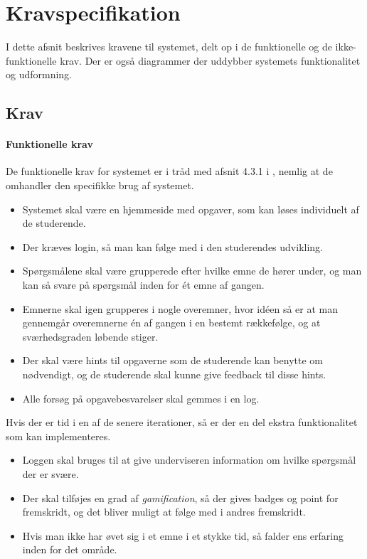 \documentclass[11pt, a4paper]{article}
\begin{document}
\section{Kravspecifikation}
\label{sec:kravspecifikation}
I dette afsnit beskrives kravene til systemet, delt op i de funktionelle og de ikke-funktionelle krav. Der er også diagrammer der uddybber systemets funktionalitet og udformning.

\subsection{Krav}
\label{sub:krav}
\paragraph{Funktionelle krav}
De funktionelle krav for systemet er i tråd med afsnit 4.3.1 i \cite{OOSE}, nemlig at de omhandler den specifikke brug af systemet.
\begin{itemize}
    \item Systemet skal være en hjemmeside med opgaver, som kan løses individuelt af de studerende.
    \item Der kræves login, så man kan følge med i den studerendes udvikling.
    \item Spørgsmålene skal være grupperede efter hvilke emne de hører under, og man kan så svare på spørgsmål inden for ét emne af gangen.
    \item Emnerne skal igen grupperes i nogle overemner, hvor idéen så er at man gennemgår overemnerne én af gangen i en bestemt rækkefølge, og at sværhedsgraden løbende stiger.
    \item Der skal være hints til opgaverne som de studerende kan benytte om nødvendigt, og de studerende skal kunne give feedback til disse hints.
    \item Alle forsøg på opgavebesvarelser skal gemmes i en log.
\end{itemize}

Hvis der er tid i en af de senere iterationer, så er der en del ekstra funktionalitet som kan implementeres.
\begin{itemize}
    \item Loggen skal bruges til at give underviseren information om hvilke spørgsmål der er svære.
    \item Der skal tilføjes en grad af \emph{gamification}, så der gives badges og point for fremskridt, og det bliver muligt at følge med i andres fremskridt.
    \item Hvis man ikke har øvet sig i et emne i et stykke tid, så falder ens erfaring inden for det område.
\end{itemize}
\end{document}
